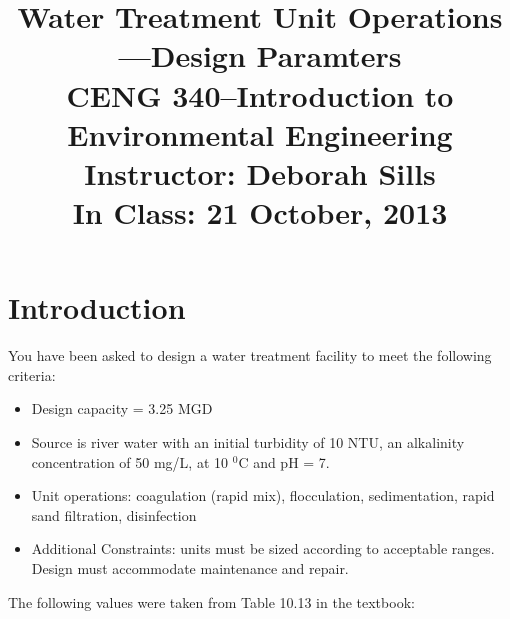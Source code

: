 \documentclass[11pt,letterpaper]{article}
\begin{document}
\setlength{\parindent}{0cm} 



\frenchspacing

\setlength{\textwidth}{6.25in}

\title {\Large{\textbf{Water Treatment Unit Operations---Design Paramters}}\\ \large{CENG 340--Introduction to Environmental Engineering\\
Instructor: Deborah Sills\\ \textbf{In Class: 21 October, 2013}}}

\author {}
\date {}
\maketitle

\vspace{-1.5cm}
\section *{Introduction}
You have been asked to design a water treatment facility to meet the following criteria:

\begin{itemize}
\item Design capacity = 3.25 MGD
\item Source is river water with an initial turbidity of 10 NTU, an alkalinity concentration of 50 mg/L, at 10 $^0$C and pH = 7.
\item Unit operations: coagulation (rapid mix), flocculation, sedimentation, rapid sand filtration, disinfection
\item Additional Constraints: units must be sized according to acceptable ranges.  Design must accommodate maintenance and repair.\\
\end{itemize}






 The following values were taken from Table 10.13 in the textbook:\\
\end{document}
